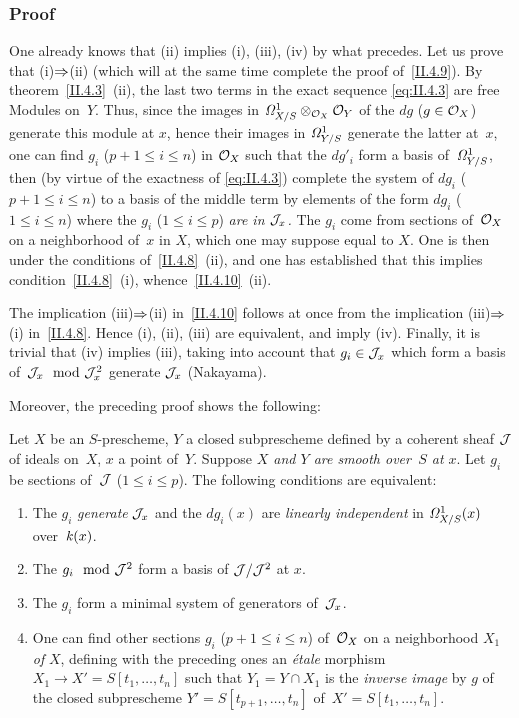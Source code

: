 \subsubsection*{Proof}
One already knows that (ii) implies (i), (iii), (iv) by what
precedes. Let us prove that (i)$\To$(ii) (which
will at the same time complete the proof
of~\ref{II.4.9}).
By theorem~\ref{II.4.3}~(ii), the last two
terms in the exact sequence \eqref{eq:II.4.3} are free Modules
on~$Y$. Thus, since the images in
$\it{\Omega}^1_{X/S}\otimes_{\cal{O}_X} \cal{O}_Y$ of the $dg$ ($g \in
\cal{O}_X$) generate this module at $x$, hence their images in
$\it{\Omega}^1_{Y/S}$ generate the latter at~$x$, one can find
$g_i$ ($p+1 \leq i \leq n$) in $\cal{O}_X$ such that the $dg'_i$
form a basis of~$\it{\Omega}^1_{Y/S}$, then (by virtue of
the exactness of \eqref{eq:II.4.3}) complete the system of
$dg_i$ ($p+1 \leq i \leq n$) to a basis of the middle term by
elements of the form $dg_i$ ($1 \leq i \leq n$) where the
$g_i$ ($1 \leq i \leq p$) \emph{are in $\cal{J}_x$.} The $g_i$
come from sections of~$\cal{O}_X$ on a neighborhood of~$x$ in
$X$, which one may suppose equal to $X$. One is then under the
conditions of~\ref{II.4.8}~(ii), and one has established that this implies
condition~\ref{II.4.8}~(i), whence~\ref{II.4.10}~(ii).

The implication (iii)$\To$(ii) in~\ref{II.4.10} follows
at once from the implication (iii)$\To$(i)
in~\ref{II.4.8}. Hence
(i), (ii), (iii)
are equivalent, and
imply (iv). Finally, it is trivial that (iv) implies (iii), taking
into account that $g_i \in \cal{J}_x$ which form a basis of~$\cal{J}_x
\mod \cal{J}_x^2$ generate $\cal{J}_x$ (Nakayama).

Moreover, the preceding proof shows the following:
\begin{corollary}
\label{II.4.11}
Let $X$ be an $S$-prescheme, $Y$ a closed subprescheme
defined by a coherent sheaf $\cal{J}$
of ideals on~$X$, $x$ a point of~$Y$. Suppose \emph{$X$ and $Y$
are smooth over~$S$ at $x$}. Let $g_i$ be sections of~$\cal{J}$ ($1
\leq i \leq p$). The following conditions are equivalent:
\begin{enumerate}
\item[(i)] The $g_i$ \emph{generate} $\cal{J}_x$ and the $dg_i(x)$
are \emph{linearly independent} in
$\it{\Omega}^1_{X/S}(x)$
over~$\kres(x)$.
\item[(ii)] The $g_i \mod \cal{J}^2$ form a basis of
$\cal{J}/\cal{J}^2$ at $x$.
\item[(iii)] The $g_i$ form a minimal system of
generators of~$\cal{J}_x$.
\item[(iv)] One can find other sections $g_i$ ($p+1 \leq i \leq
n$) of~$\cal{O}_X$ on a neighborhood $X_1$ \emph{of} $X$,
defining with the preceding ones an
\emph{\'etale} morphism $X_1 \to X'=S[t_1,\dots,t_n]$ such that $Y_1=Y \cap
X_1$ is the \emph{inverse image} by $g$ of the closed subprescheme
$Y'=S[t_{p+1},\dots,t_n]$ of~$X'=S[t_{1},\dots,t_n]$.
\end{enumerate}
\end{corollary}

